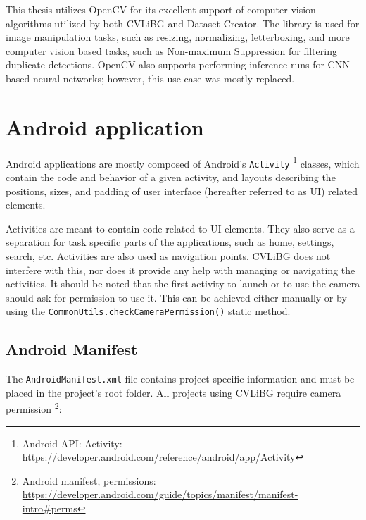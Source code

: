 This thesis utilizes OpenCV for its excellent support of computer vision algorithms utilized by both CVLiBG and Dataset Creator. The library is used for image manipulation tasks, such as resizing, normalizing, letterboxing, and more computer vision based tasks, such as Non-maximum Suppression for filtering duplicate detections. OpenCV also supports performing inference runs for CNN based neural networks; however, this use-case was mostly replaced.



\section{Android application}
Android applications are mostly composed of Android's \texttt{Activity} \footnote{Android API: Activity: \url{https://developer.android.com/reference/android/app/Activity}} classes, which contain the code and behavior of a given activity, and layouts describing the positions, sizes, and padding of user interface (hereafter referred to as UI) related elements. 

Activities are meant to contain code related to UI elements. They also serve as a separation for task specific parts of the applications, such as home, settings, search, etc. Activities are also used as navigation points. CVLiBG does not interfere with this, nor does it provide any help with managing or navigating the activities. It should be noted that the first activity to launch or to use the camera should ask for permission to use it. This can be achieved either manually or by using the \texttt{CommonUtils.checkCameraPermission()} static method.



\subsection{Android Manifest}
The \texttt{AndroidManifest.xml} file contains project specific information and must be placed in the project's root folder. All projects using CVLiBG require camera permission \footnote{Android manifest, permissions: \url{https://developer.android.com/guide/topics/manifest/manifest-intro\#perms}}:



